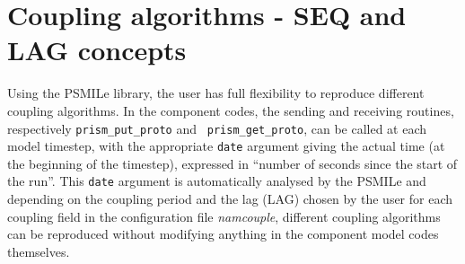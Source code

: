 %
%
%


\section{Coupling algorithms - SEQ and LAG concepts}
\label{subsubsec_Algoritms}

Using the PSMILe library, the user has full flexibility to reproduce
different coupling algorithms. In the component codes, the sending and
receiving routines, respectively {\tt prism\_put\_proto} and {\tt
  prism\_get\_proto}, can be called at each model timestep, with the
appropriate {\tt date} argument giving the actual time (at the
beginning of the timestep), expressed in ``number of seconds since the
start of the run''. This {\tt date} argument is automatically analysed
by the PSMILe
and depending on the coupling period and the lag (LAG) chosen by the 
user for each coupling field in the configuration file {\it namcouple}, different
coupling algorithms can be reproduced without modifying anything in the
component model codes themselves. 


